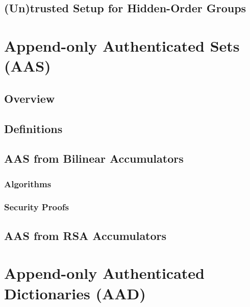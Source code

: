 \documentclass[12pt,twoside,singlespace]{mitthesis}
\begin{document}
        \section{(Un)trusted Setup for Hidden-Order Groups}
        \label{s:prelim:trusted-setup-rsa}
        
    
    \chapter{Append-only Authenticated Sets (AAS)}
    \label{s:aas}
    
        \section{Overview}
        \label{s:aas:intro}
        
        
        \section{Definitions}
        \label{s:aas:defs}
        
        
        \section{AAS from Bilinear Accumulators}
        \label{s:aas:from-bilinear-acc}
        
        
            \subsection{Algorithms}
            \label{s:aas:from-bilinear-acc:algorithms}
            
            
            \subsection{Security Proofs}
            \label{s:aas:from-bilinear-acc:proofs}
            
        
        
        \section{AAS from RSA Accumulators}
        \label{s:aas:from-rsa-acc}
        
    
    \chapter{Append-only Authenticated Dictionaries (AAD)}
    \label{s:aad}
    
\end{document}
